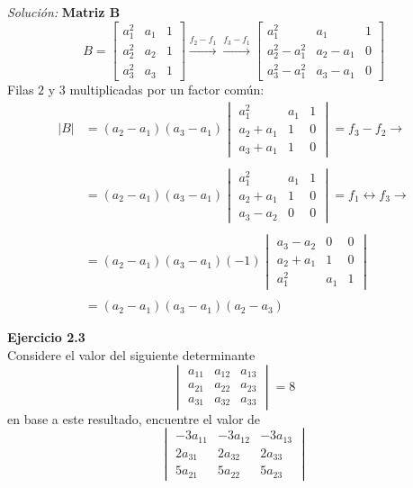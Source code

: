 \documentclass{article}
\newenvironment{problem}[2][Ejercicio]
    { \begin{mdframed}[backgroundcolor=gray!20] \textbf{#1 #2} \\}
    {  \end{mdframed}}
\newenvironment{solution}
    {\textit{Solución:}}
    {}
\begin{document}
\begin{solution}
    \textbf{Matriz B}
    \[
    B = \begin{bmatrix}
    a_1^2 & a_1 & 1 \\
    a_2^2 & a_2 & 1 \\
    a_3^2 & a_3 & 1
    \end{bmatrix} \xrightarrow{f_2-f_1} \xrightarrow{f_3-f_1}
    \begin{bmatrix}
    a_1^2 & a_1 & 1 \\
    a_2^2-a_1^2 & a_2-a_1 & 0 \\
    a_3^2 - a_1^2 & a_3 - a_1 & 0
    \end{bmatrix}
    \]
    Filas $2$ y $3$ multiplicadas por un factor común:
    \[
    \begin{aligned}
    | B | &= (a_2- a_1) (a_3-a_1)
    \begin{vmatrix}
    a_1^2 & a_1 & 1 \\
    a_2+a_1 & 1 & 0 \\
    a_3 + a_1 & 1 & 0
    \end{vmatrix} = f_3-f_2 \rightarrow \\ \\ 
    &= (a_2- a_1) (a_3-a_1)
    \begin{vmatrix}
    a_1^2 & a_1 & 1 \\
    a_2+a_1 & 1 & 0 \\
    a_3 - a_2 & 0 & 0
    \end{vmatrix} = f_1 \leftrightarrow f_3 \rightarrow \\ \\ 
    &= (a_2- a_1) (a_3-a_1) (-1)
    \begin{vmatrix}
    a_3 - a_2 & 0 & 0 \\
    a_2+a_1 & 1 & 0 \\
    a_1^2 & a_1 & 1
    \end{vmatrix} \\ \\
    &= (a_2- a_1) (a_3-a_1) (a_2-a_3)
    \end{aligned}
    \]
\end{solution}
\begin{problem}{2.3}	
    Considere el valor del siguiente determinante
\[
\begin{vmatrix}
a_{11} & a_{12} & a_{13} \\
a_{21} & a_{22} & a_{23} \\
a_{31} & a_{32} & a_{33} 
\end{vmatrix} = 8
\]
en base a este resultado, encuentre el valor de
\[
\begin{vmatrix}
-3a_{11} & -3a_{12} & -3a_{13} \\
2a_{31} & 2a_{32} & 2a_{33} \\
5a_{21} & 5a_{22} & 5a_{23}
\end{vmatrix}
\]
\end{problem}
\end{document}
